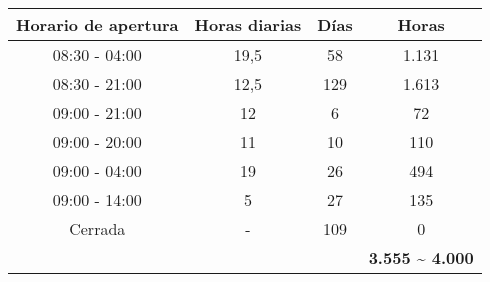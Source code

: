 \begin{tabular}{|c|c|c|c|}
\hline
\rowcolor[HTML]{343434} 
{\color[HTML]{FFFFFF} \textbf{Horario de apertura}} & {\color[HTML]{FFFFFF} \textbf{Horas diarias}} & {\color[HTML]{FFFFFF} \textbf{Días}} & {\color[HTML]{FFFFFF} \textbf{Horas}} \\ \hline
08:30 - 04:00 & 19,5 & 58  & 1.131 \\ \hline
08:30 - 21:00 & 12,5 & 129 & 1.613 \\ \hline
09:00 - 21:00 & 12   & 6   & 72    \\ \hline
09:00 - 20:00 & 11   & 10  & 110   \\ \hline
09:00 - 04:00 & 19   & 26  & 494   \\ \hline
09:00 - 14:00 & 5    & 27  & 135   \\ \hline
Cerrada       & -    & 109 & 0     \\ \hline
\multicolumn{3}{|r|}{\cellcolor[HTML]{343434}{\color[HTML]{FFFFFF} \textbf{TOTAL HORAS}}}                                                  & \textbf{3.555 \textasciitilde{} 4.000}                        \\ \hline
\end{tabular}